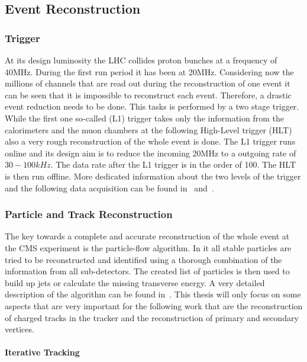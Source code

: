 \subsection{Event Reconstruction \label{LHCCMSEventReco}}

\subsubsection{Trigger}

At its design luminosity the LHC collides proton bunches at a frequency of 40\unit{MHz}. During the first run period it has been at 20\unit{MHz}. Considering now the millions of channels that are read out during the reconstruction of one event it can be seen that it is impossible to reconstruct each event. Therefore, a drastic event reduction needs to be done. This tasks is performed by a two stage trigger. While the first one so-called \Lone{} (L1) trigger takes only the information from the calorimeters and the muon chambers at the following High-Level trigger (HLT) also a very rough reconstruction of the whole event is done. The L1 trigger runs online and its design aim is to reduce the incoming 20\unit{MHz} to a outgoing rate of $30-100\unit{kHz}$. The data rate after the L1 trigger is in the order of 100\GBytes{}. The HLT is then run offline. More dedicated information about the two levels of the trigger and the following data acquisition can be found in~ and~.

\subsubsection{Particle and Track Reconstruction}

The key towards a complete and accurate reconstruction of the whole event at the CMS experiment is the particle-flow algorithm. In it all stable particles are tried to be reconstructed and identified using a thorough combination of the information from all sub-detectors. The created list of particles is then used to build up jets or calculate the missing transverse energy. A very detailed description of the algorithm can be found in~. This thesis will only focus on some aspects that are very important for the following work that are the reconstruction of charged tracks in the tracker and the reconstruction of primary and secondary vertices.

\paragraph{Iterative Tracking}

